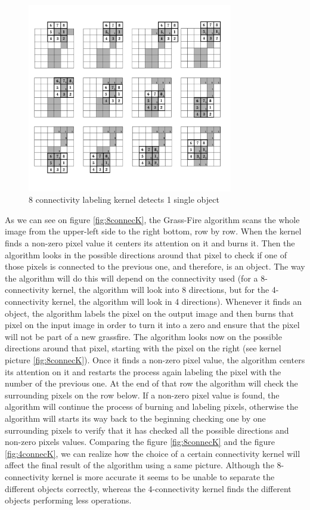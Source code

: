 \begin{figure}[htbp]
\centering
\includegraphics[width=0.8\textwidth]{Pictures/Theory/8connec_kernel.png}
\caption{8 connectivity labeling kernel detects 1 single object}
\label{fig:8connecK}
\end{figure}

As we can see on figure \eqref{fig:8connecK}, the Grass-Fire algorithm scans the whole image from the upper-left side to the right bottom, row by row. When the kernel finds a non-zero pixel value it centers its attention on it and burns it. Then the algorithm looks in the possible directions around that pixel to check if one of those pixels is connected to the previous one, and therefore, is an object. The way the algorithm will do this will depend on the connectivity used (for a 8-connectivity kernel, the algorithm will look into 8 directions, but for the 4-connectivity kernel, the algorithm will look in 4 directions).
Whenever it finds an object, the algorithm labels the pixel on the output image and then burns that pixel on the input image in order to turn it into a zero and ensure that the pixel will not be part of a new grassfire.
The algorithm looks now on the possible directions around that pixel, starting with the pixel on the right (see kernel picture \eqref{fig:8connecK}). Once it finds a non-zero pixel value, the algorithm centers its attention on it and restarts the process again labeling the pixel with the number of the previous one. At the end of that row the algorithm will check the surrounding pixels on the row below. If a non-zero pixel value is found, the algorithm will continue the process of burning and labeling pixels, otherwise the algorithm will starts its way back to the beginning checking one by one surrounding pixels to verify that it has checked all the possible directions and non-zero pixels values.
Comparing the figure \eqref{fig:8connecK} and the figure \eqref{fig:4connecK}, we can realize how the choice of a certain connectivity kernel will affect the final result of the algorithm using a same picture. Although the 8-connectivity kernel is more accurate it seems to be unable to separate the different objects correctly, whereas the 4-connectivity kernel finds the different objects performing less operations.

